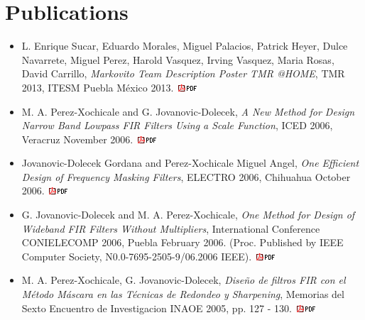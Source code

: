 \documentclass[10pt]{article}
\begin{document}
    \section*{Publications}
    \begin{itemize}
    
    \item L. Enrique Sucar, Eduardo Morales, Miguel Palacios, Patrick Heyer, Dulce Navarrete, Miguel Perez, Harold Vasquez, Irving Vasquez, Maria Rosas, 
David Carrillo, \textit{Markovito Team Description Poster TMR @HOME}, TMR 2013, ITESM Puebla M\'exico 2013. 
\href{https://sites.google.com/site/perezxochicale/publications/PosterMarkovitoTMR2013-V3.0.pdf}{\includegraphics[scale=.5]{icon_pdf_small}} 

\item M. A. Perez-Xochicale and G. Jovanovic-Dolecek,
\textit{A New Method for Design Narrow Band Lowpass FIR Filters Using a Scale Function}, ICED 2006, Veracruz November 2006. 
\href{https://sites.google.com/site/perezxochicale/docs/Iced06.pdf}{\includegraphics[scale=.5]{icon_pdf_small}}


\item 
Jovanovic-Dolecek Gordana and Perez-Xochicale Miguel Angel,
\textit{One Efficient Design of Frequency Masking Filters},
ELECTRO 2006, Chihuahua October 2006. \href{https://sites.google.com/site/perezxochicale/docs/Electro06.pdf}{\includegraphics[scale=.5]{icon_pdf_small}}


\item 
G. Jovanovic-Dolecek and M. A. Perez-Xochicale,
\textit{One Method for Design of Wideband FIR Filters Without Multipliers},
International Conference CONIELECOMP 2006, Puebla February 2006. (Proc.
Published by IEEE Computer Society, N0.0-7695-2505-9/06.2006 IEEE). 
\href{https://sites.google.com/site/perezxochicale/docs/CONIELECOMP06.pdf}{\includegraphics[scale=.5]{icon_pdf_small}}


\item 
M. A. Perez-Xochicale, G. Jovanovic-Dolecek,
\textit{Dise\~no de filtros FIR con el M\'etodo M\'ascara en las T\'ecnicas de Redondeo y Sharpening},
Memorias del Sexto Encuentro de Investigacion INAOE 2005, pp. 127 - 130. 
\href{https://sites.google.com/site/perezxochicale/docs/Inaoe05.pdf}{\includegraphics[scale=.5]{icon_pdf_small}}

		\end{itemize}
    
\end{document}
